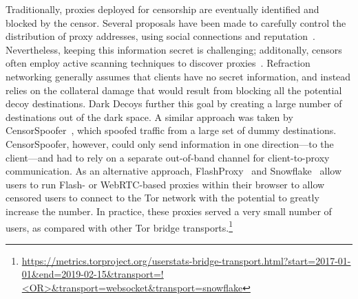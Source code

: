 Traditionally, proxies deployed for censorship are eventually identified and blocked by the censor. Several proposals have been made to carefully control  the distribution of proxy addresses, using social connections and reputation~\cite{proximax,rbridge,salmon}. Nevertheless, keeping this information secret is challenging; additonally, censors often employ active scanning techniques to discover proxies~\cite{Dunna2018a}. Refraction networking generally assumes that clients have no secret information, and instead relies on the  collateral damage that would result from blocking all the potential decoy destinations. Dark Decoys further this goal by creating a large number of destinations out of the dark space. A similar approach was taken by CensorSpoofer~\cite{censorspoofer}, which spoofed traffic from a large set of dummy destinations. CensorSpoofer, however, could only send information in one direction---to the client---and had to rely on a separate out-of-band channel for client-to-proxy communication. As an alternative approach, FlashProxy~\cite{flash-proxies} and Snowflake~\cite{snowflake} allow users to run Flash- or WebRTC-based proxies within their browser to allow censored users to connect to the Tor network with the potential to greatly increase the number. In practice, these proxies served a very small number of users, as compared with other Tor bridge transports.\footnote{\url{https://metrics.torproject.org/userstats-bridge-transport.html?start=2017-01-01&end=2019-02-15&transport=!<OR>&transport=websocket&transport=snowflake}}
